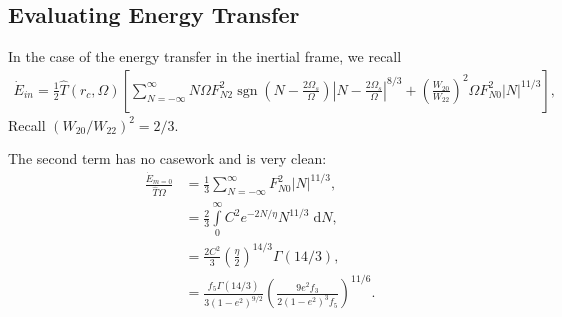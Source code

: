 \documentclass[
        fleqn,
        usenatbib,
        referee,
    ]{mnras}
\newcommand*{\abs}[1]{\left|#1\right|}
\newcommand*{\p}[1]{\left(#1\right)}
\newcommand*{\s}[1]{\left[#1\right]}
\DeclareMathOperator*{\sgn}{sgn}
\begin{document}
\subsection{Evaluating Energy Transfer}

In the case of the energy transfer in the inertial frame, we recall
\begin{align}
     \dot{E}_{in} = \frac{1}{2}\hat{T}\p{r_c, \Omega}\s{
         \sum\limits_{N = -\infty}^\infty
            N\Omega F_{N2}^2 \sgn \p{N - \frac{2\Omega_s}{\Omega}} \abs{N -
            \frac{2\Omega_s}{\Omega}}^{8/3}
            + \p{\frac{W_{20}}{W_{22}}}^2\Omega F_{N0}^2 \abs{N}^{11/3}},
\end{align}
Recall $\p{W_{20} / W_{22}}^2 = 2/3$.

The second term has no casework and is very clean:
\begin{align}
    \frac{\dot{E}_{m=0}}{\hat{T}\Omega}
        &= \frac{1}{3} \sum\limits_{N = -\infty}^\infty
            F_{N0}^2\abs{N}^{11/3},\\
        &= \frac{2}{3}\int\limits_0^\infty C^2e^{-2N/\eta}N^{11/3}
            \;\mathrm{d}N,\\
        &= \frac{2C^2}{3}\p{\frac{\eta}{2}}^{14/3}\Gamma(14/3),\\
        &= \frac{f_5\Gamma(14/3)}{3\p{1 - e^2}^{9/2}}
            \p{\frac{9e^2f_3}{2\p{1 - e^2}^3 f_5}}^{11/6}.
\end{align}
\end{document}
